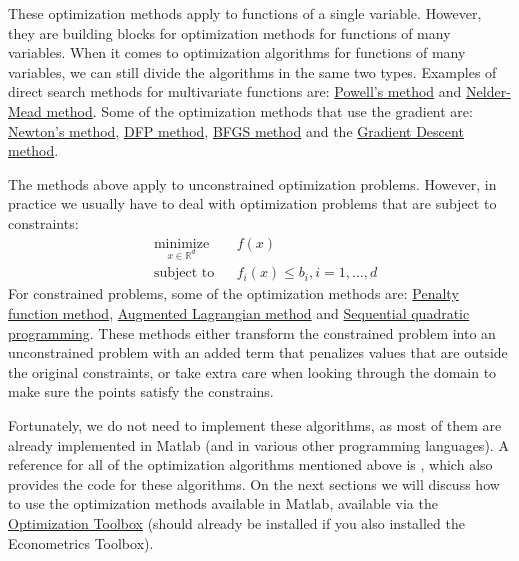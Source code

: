 \documentclass[12pt, a4paper]{article}
\begin{document}
These optimization methods apply to functions of a single variable.
However, they are building blocks for optimization methods for functions of many variables.
When it comes to optimization algorithms for functions of many variables, we can still divide the algorithms in the same two types.
Examples of direct search methods for multivariate functions are: \href{https://en.wikipedia.org/wiki/Powell's\_method}{Powell's method} and \href{https://en.wikipedia.org/wiki/Nelder–Mead\_method}{Nelder-Mead method}.
Some of the optimization methods that use the gradient are: \href{https://en.wikipedia.org/wiki/Newton's\_method}{Newton's method}, \href{https://en.wikipedia.org/wiki/Davidon–Fletcher–Powell\_formula}{DFP method}, \href{https://en.wikipedia.org/wiki/Broyden–Fletcher–Goldfarb–Shanno\_algorithm}{BFGS method} and the \href{https://en.wikipedia.org/wiki/Gradient\_descent}{Gradient Descent method}.

The methods above apply to unconstrained optimization problems.
However, in practice we usually have to deal with optimization problems that are subject to constraints:
\begin{equation*}
\begin{aligned}
& \underset{x\in\mathbb{R}^d}{\text{minimize}}
& & f(x)\\
& \text{subject to}
& & f_i(x) \leq b_i, i=1,\ldots, d
\end{aligned}
\end{equation*}
For constrained problems, some of the optimization methods are: \href{https://en.wikipedia.org/wiki/Penalty\_method}{Penalty function method}, \href{https://en.wikipedia.org/wiki/Augmented\_Lagrangian\_method}{Augmented Lagrangian method} and \href{https://en.wikipedia.org/wiki/Sequential\_quadratic\_programming}{Sequential quadratic programming}.
These methods either transform the constrained problem into an unconstrained problem with an added term that penalizes values that are outside the original constraints, or take extra care when looking through the domain to make sure the points satisfy the constrains.

Fortunately, we do not need to implement these algorithms, as most of them are already implemented in Matlab (and in various other programming languages).
A reference for all of the optimization algorithms mentioned above is \citet{A2015}, which also provides the code for these algorithms.
On the next sections we will discuss how to use the optimization methods available in Matlab, available via the \href{https://www.mathworks.com/help/optim/}{Optimization Toolbox} (should already be installed if you also installed the Econometrics Toolbox).
\end{document}
